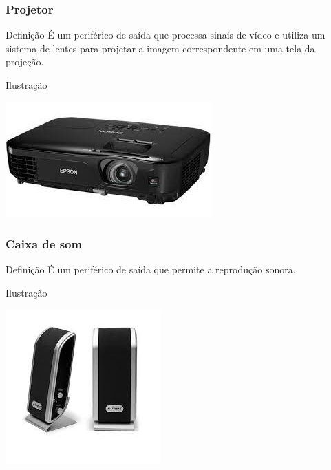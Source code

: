 \documentclass[aspectratio=169]{beamer} %
\begin{document}
\begin{frame}
	\frametitle{Projetor}
	
	\begin{block}{Defini\c cão}
		É um periférico de saída que processa sinais de vídeo e utiliza um sistema de lentes para projetar a imagem correspondente em uma tela da projeção.
	\end{block}\vfill
	
	\begin{exampleblock}{Ilustra\c cão}
		\begin{center}
			\includegraphics[scale=0.5]{img/projetor}
		\end{center}		
	\end{exampleblock}
\end{frame}

\begin{frame}
	\frametitle{Caixa de som}
	
	\begin{block}{Defini\c cão}
		É um periférico de saída que permite a reprodução sonora.
	\end{block}\vfill
	
	\begin{exampleblock}{Ilustra\c cão}
		\begin{center}
			\includegraphics[scale=0.5]{img/caixa-de-som}
		\end{center}		
	\end{exampleblock}
\end{frame}
\end{document}
